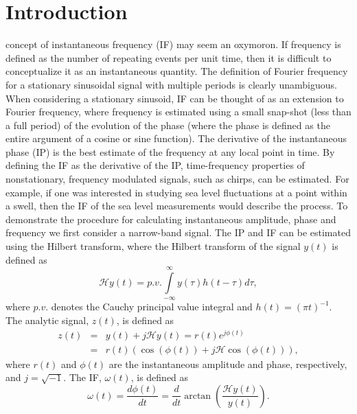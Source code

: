 \documentclass[a4paper]{IEEEtran}
\begin{document}
\section{Introduction}
 concept of instantaneous frequency (IF) may seem an oxymoron. If frequency is defined as the number of repeating events per unit time, then it is difficult to conceptualize it as an instantaneous quantity. The definition of Fourier frequency for a stationary sinusoidal signal with multiple periods is clearly unambiguous. When considering a stationary sinusoid, IF can be thought of as an extension to Fourier frequency, where frequency is estimated using a small snap-shot (less than a full period) of the evolution of the phase (where the phase is defined as the entire argument of a cosine or sine function). The derivative of the instantaneous phase (IP) is the best estimate of the frequency at any local point in time. By defining the IF as the derivative of the IP, time-frequency properties of nonstationary, frequency modulated signals, such as chirps, can be estimated. For example, if one was interested in studying sea level fluctuations at a point within a swell, then the IF of the sea level measurements would describe the process. To demonstrate the procedure for calculating instantaneous amplitude, phase and frequency we first consider a narrow-band signal. The IP and IF can be estimated using the Hilbert transform, where the Hilbert transform of the signal $y(t)$ is defined as
\begin{equation}\label{eq:HilbertTransform}
\mathcal{H}y\left( t \right) = p.v.\int\limits_{ - \infty }^\infty  {y\left( \tau  \right)h\left( {t - \tau } \right)} d\tau,
\end{equation}
where $p.v.$ denotes the Cauchy principal value integral and $h\left( t \right) = {\left( {\pi t} \right)^{ - 1}}$. The analytic signal, $z(t)$, is defined as
\begin{eqnarray}\label{eq:AnalyticSignal}
z\left( t \right) &=& y\left( t \right) + j\mathcal{H}y\left( t \right) = r\left( t \right){e^{j\phi \left( t \right)}}\\
    &=& r\left( t \right)\left(\cos\left(\phi\left(t\right)\right) + j \mathcal{H}\cos\left(\phi\left(t\right)\right)\right),
\end{eqnarray}
where $r(t)$ and $\phi(t)$ are the instantaneous amplitude and phase, respectively, and $j=\sqrt{-1}$. The IF, $\omega(t)$, is defined as
\begin{equation}\label{eq:InstantaneousFreq}
\omega \left( t \right) = \frac{d\phi \left( t \right)}{dt} = \frac{d}{dt}\arctan\left(\frac{\mathcal{H}y\left( t \right)}{y\left(t\right)}\right).
\end{equation}
\end{document}

